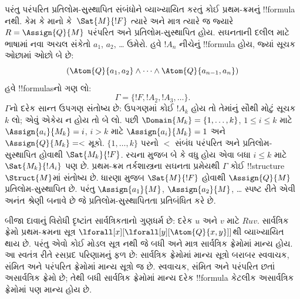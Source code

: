 \documentclass[../../../include/open-logic-section]{subfiles}
\begin{document}
પરંતુ પરંપરિત પ્રતિલોમ-સુસ્થાપિત સંબંધોને
વ્યાખ્યાયિત કરતું કોઈ પ્રથમ-ક્રમનું !!{formula}
નથી. કેમ કે માનો કે~$\Sat{M}{!F}$ ત્યારે અને માત્ર
ત્યારે જ જ્યારે $R =
\Assign{Q}{M}$ પરંપરિત અને પ્રતિલોમ-સુસ્થાપિત હોય.
સઘનતાની દલીલ માટે ભાષામાં નવા અચલ સંકેતો
$a_1$, $a_2$, \dots{} ઉમેરો. હવે $!A_n$ નીચેનું
!!{formula} હોય, જ્યાં સૂચક ઓછામાં ઓછો બે છે:
\[
(\Atom{Q}{a_1,a_2} \land \dots \land
    \Atom{Q}{a_{n-1},a_{n}})
\]
હવે !!{formula}sનો ગણ લો:
\[
\Gamma = \{!F, !A_2, !A_3, \dots\}.
\]
$\Gamma$નો દરેક સાન્ત ઉપગણ સંતોષ્ય છે: ઉપગણમાં
કોઈ $!A_k$ હોય તો તેમાંનું સૌથી મોટું સૂચક $k$
લો; એવું એકેય ન હોય તો બે લો. પછી
$\Domain{M_k} = \{1, \dots, k\}$,
$1\le i\le k$ માટે $\Assign{a_i}{M_k} = i$,
$i>k$ માટે $\Assign{a_i}{M_k}=1$ અને
$\Assign{Q}{M_k} = <$ મૂકો.
$\{1,
\dots, k\}$ પરનો $<$ સંબંધ પરંપરિત અને
પ્રતિલોમ-સુસ્થાપિત હોવાથી $\Sat{M_k}{!F}$.
રચના મુજબ બે કે વધુ હોય એવા બધા $i \le k$ માટે
$\Sat{M_k}{!A_i}$ પણ છે.
પ્રથમ-ક્રમ તર્કશાસ્ત્રના સઘનતા પ્રમેયથી $\Gamma$
કોઈ !!{structure}~$\Struct{M}$માં સંતોષ્ય છે.
ધારણા મુજબ $\Sat{M}{!F}$ હોવાથી
$\Assign{Q}{M}$ પ્રતિલોમ-સુસ્થાપિત છે. પરંતુ
$\Assign{a_1}{M}$, $\Assign{a_2}{M}$,
\dots{} સ્પષ્ટ રીતે એવી અનંત શ્રેણી બનાવે છે
જે પ્રતિલોમ-સુસ્થાપિતતા પ્રતિબંધિત કરે છે.

બીજા દાવાનું વિરોધી દૃષ્ટાંત સાર્વત્રિકતાનો ગુણધર્મ
છે: દરેક $u$ અને $v$ માટે $Ruv$. સાર્વત્રિક
ફ્રેમો પ્રથમ-ક્રમના સૂત્ર
$\lforall[x][\lforall[y][\Atom{Q}{x,y}]]$થી
વ્યાખ્યાયિત થાય છે. પરંતુ એવો કોઈ મોડલ સૂત્ર
નથી જે બધી અને માત્ર સાર્વત્રિક ફ્રેમોમાં માન્ય હોય.
આ સ્વતંત્ર રીતે રસપ્રદ પરિણામનું ફળ છે: સાર્વત્રિક
ફ્રેમોમાં માન્ય સૂત્રો બરાબર સ્વવાચક, સંમિત અને
પરંપરિત ફ્રેમોમાં માન્ય સૂત્રો જ છે. સ્વવાચક,
સંમિત અને પરંપરિત છતાં અસાર્વત્રિક ફ્રેમો છે;
તેથી બધી સાર્વત્રિક ફ્રેમોમાં માન્ય દરેક !!{formula}
કેટલીક અસાર્વત્રિક ફ્રેમોમાં પણ માન્ય હોય છે.
\end{document}
